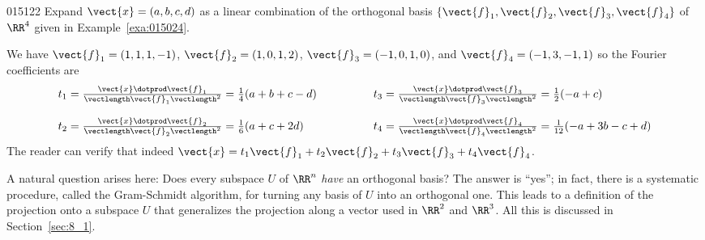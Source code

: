 \begin{example}{}{015122}
Expand $\vect{x} = (a, b, c, d)$ as a linear combination of the orthogonal basis $\{\vect{f}_{1}, \vect{f}_{2}, \vect{f}_{3}, \vect{f}_{4}\}$ of $\RR^4$ given in Example~\ref{exa:015024}.


\begin{solution}
We have $\vect{f}_{1} = (1, 1, 1, -1)$, $\vect{f}_{2} = (1, 0, 1, 2)$, $\vect{f}_{3} = (-1, 0, 1, 0)$, and $\vect{f}_{4} = (-1, 3, -1, 1)$ so the Fourier coefficients are
\begin{equation*}
\begin{array}{lcl}
	t_1 = \frac{\vect{x} \dotprod \vect{f}_1}{\vectlength\vect{f}_1\vectlength^2} = \frac{1}{4}(a + b + c - d) & \hspace{3em} &
	t_3 = \frac{\vect{x} \dotprod \vect{f}_3}{\vectlength\vect{f}_3\vectlength^2} = \frac{1}{2}(-a + c) \\
	& \\
	t_2 = \frac{\vect{x} \dotprod \vect{f}_2}{\vectlength\vect{f}_2\vectlength^2} = \frac{1}{6}(a + c + 2d) & &
	t_4 = \frac{\vect{x} \dotprod \vect{f}_4}{\vectlength\vect{f}_4\vectlength^2} = \frac{1}{12}(-a + 3b -c + d)
\end{array}
\end{equation*}
The reader can verify that indeed $\vect{x} = t_{1}\vect{f}_{1} + t_{2}\vect{f}_{2} + t_{3}\vect{f}_{3} + t_{4}\vect{f}_{4}$.
\end{solution}
\end{example}

A natural question arises here: Does every subspace $U$ of $\RR^n$ \textit{have} an orthogonal basis? The answer is ``yes''; in fact, there is a systematic procedure, called the Gram-Schmidt algorithm, for turning any basis of $U$ into an orthogonal one. This leads to a definition of the projection onto a subspace $U$ that generalizes the projection along a vector used in $\RR^2$ and $\RR^3$. All this is discussed in Section~\ref{sec:8_1}.
